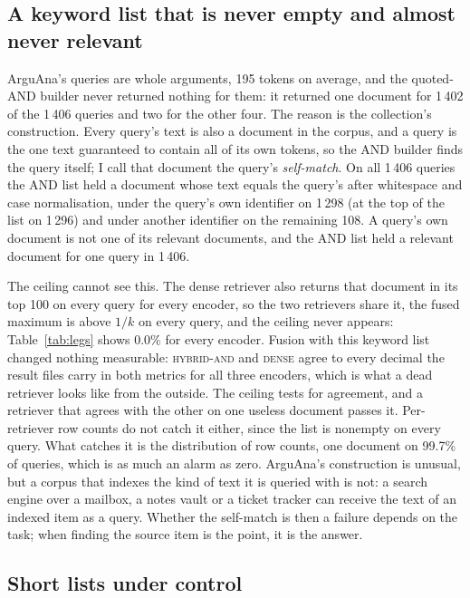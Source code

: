 \documentclass[11pt]{article}
\begin{document}
\subsection{A keyword list that is never empty and almost never relevant}
\label{sec:arguana}

ArguAna's queries are whole arguments, 195 tokens on average, and the quoted-AND builder never returned nothing for them: it returned one document for 1\,402 of the 1\,406 queries and two for the other four. The reason is the collection's construction. Every query's text is also a document in the corpus, and a query is the one text guaranteed to contain all of its own tokens, so the AND builder finds the query itself; I call that document the query's \emph{self-match}. On all 1\,406 queries the AND list held a document whose text equals the query's after whitespace and case normalisation, under the query's own identifier on 1\,298 (at the top of the list on 1\,296) and under another identifier on the remaining 108. A query's own document is not one of its relevant documents, and the AND list held a relevant document for one query in 1\,406.

The ceiling cannot see this. The dense retriever also returns that document in its top 100 on every query for every encoder, so the two retrievers share it, the fused maximum is above $1/k$ on every query, and the ceiling never appears: Table~\ref{tab:legs} shows 0.0\% for every encoder. Fusion with this keyword list changed nothing measurable: \textsc{hybrid-and} and \textsc{dense} agree to every decimal the result files carry in both metrics for all three encoders, which is what a dead retriever looks like from the outside. The ceiling tests for agreement, and a retriever that agrees with the other on one useless document passes it. Per-retriever row counts do not catch it either, since the list is nonempty on every query. What catches it is the distribution of row counts, one document on 99.7\% of queries, which is as much an alarm as zero. ArguAna's construction is unusual, but a corpus that indexes the kind of text it is queried with is not: a search engine over a mailbox, a notes vault or a ticket tracker can receive the text of an indexed item as a query. Whether the self-match is then a failure depends on the task; when finding the source item is the point, it is the answer.

\subsection{Short lists under control}
\label{sec:sweep}
\end{document}
